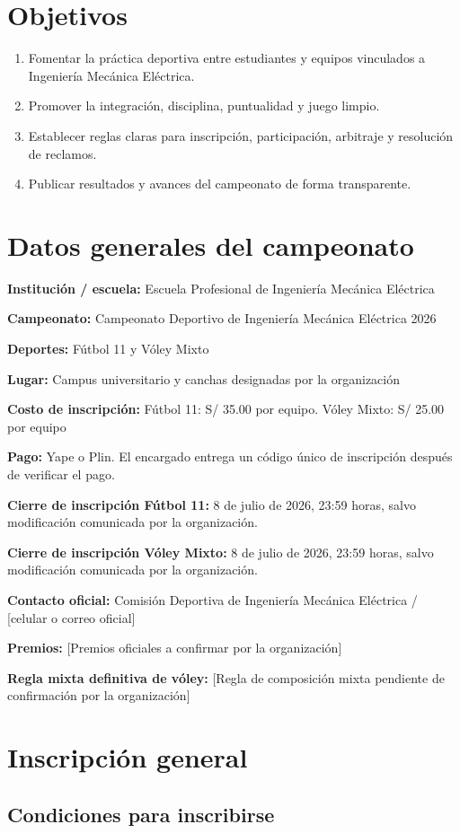 \documentclass[12pt,a4paper]{article}
\newcommand{\dato}[2]{\noindent\textbf{#1:} #2\par\vspace{0.25em}}
\begin{document}
\section{Objetivos}

\begin{enumerate}
  \item Fomentar la práctica deportiva entre estudiantes y equipos vinculados a Ingeniería Mecánica Eléctrica.
  \item Promover la integración, disciplina, puntualidad y juego limpio.
  \item Establecer reglas claras para inscripción, participación, arbitraje y resolución de reclamos.
  \item Publicar resultados y avances del campeonato de forma transparente.
\end{enumerate}

\section{Datos generales del campeonato}

\dato{Institución / escuela}{Escuela Profesional de Ingeniería Mecánica Eléctrica}
\dato{Campeonato}{Campeonato Deportivo de Ingeniería Mecánica Eléctrica 2026}
\dato{Deportes}{Fútbol 11 y Vóley Mixto}
\dato{Lugar}{Campus universitario y canchas designadas por la organización}
\dato{Costo de inscripción}{Fútbol 11: S/ 35.00 por equipo. Vóley Mixto: S/ 25.00 por equipo}
\dato{Pago}{Yape o Plin. El encargado entrega un código único de inscripción después de verificar el pago.}
\dato{Cierre de inscripción Fútbol 11}{8 de julio de 2026, 23:59 horas, salvo modificación comunicada por la organización.}
\dato{Cierre de inscripción Vóley Mixto}{8 de julio de 2026, 23:59 horas, salvo modificación comunicada por la organización.}
\dato{Contacto oficial}{Comisión Deportiva de Ingeniería Mecánica Eléctrica / [celular o correo oficial]}
\dato{Premios}{[Premios oficiales a confirmar por la organización]}
\dato{Regla mixta definitiva de vóley}{[Regla de composición mixta pendiente de confirmación por la organización]}

\section{Inscripción general}

\subsection{Condiciones para inscribirse}
\end{document}
